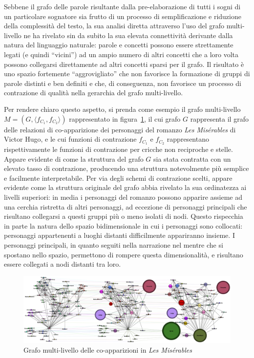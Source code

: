 
Sebbene il grafo delle parole risultante dalla pre-elaborazione di tutti i sogni di un particolare sognatore
sia frutto di un processo di semplificazione e riduzione della complessità del testo, la sua analisi diretta
attraverso l'uso del grafo multi-livello ne ha rivelato sin da subito la sua elevata connettività derivante dalla
natura del linguaggio naturale: parole e concetti possono essere strettamente legati (e quindi ``vicini'') ad un
ampio numero di altri concetti che a loro volta possono collegarsi direttamente ad altri concetti sparsi per il grafo.
Il risultato è uno spazio fortemente ``aggrovigliato'' che non favorisce la formazione di gruppi di parole distinti e
ben definiti e che, di conseguenza, non favorisce un processo di contrazione di qualità nella
gerarchia del grafo multi-livello.

Per rendere chiaro questo aspetto, si prenda come esempio il grafo multi-livello $M = (G, \langle f_{C_1}, f_{C_2}\rangle)$
rappresentato in figura~\ref{fig:les-miserables-graph}, il cui grafo $G$ rappresenta il grafo delle relazioni di
co-apparizione dei personaggi del romanzo \textit{Les Misérables} di Victor Hugo,
e le cui funzioni di contrazione $f_{C_1}$ e $f_{C_2}$ rappresentano rispettivamente le funzioni di contrazione
per cricche non reciproche e stelle.
Appare evidente di come la struttura del grafo $G$ sia stata contratta con un elevato tasso di contrazione,
producendo una struttura notevolmente più semplice e facilmente interpretabile. Per via degli schemi di
contrazione scelti, appare evidente come la struttura originale del grafo abbia rivelato la sua ordinatezza ai livelli
superiori: in media i personaggi del romanzo possono apparire assieme ad una cerchia ristretta di altri personaggi,
ad eccezione di personaggi principali che risultano collegarsi a questi gruppi più o meno isolati di nodi.
Questo rispecchia in parte la natura dello spazio bidimensionale in cui i personaggi sono collocati: personaggi
appartenenti a luoghi distanti difficilmente appariranno insieme. I personaggi principali, in quanto seguiti
nella narrazione nel mentre che si spostano nello spazio, permettono di rompere questa dimensionalità, e risultano
essere collegati a nodi distanti tra loro.

\begin{figure}[h]
    \centering
    \includegraphics[width=1\textwidth]{Immagini/les_miserables_example}
    \caption{Grafo multi-livello delle co-apparizioni in \textit{Les Misérables}}
    \label{fig:les-miserables-graph}
\end{figure}

